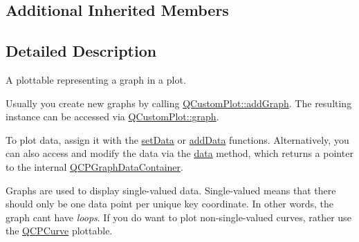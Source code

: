 \subsection*{Additional Inherited Members}


\subsection{Detailed Description}
A plottable representing a graph in a plot. 



Usually you create new graphs by calling \hyperlink{class_q_custom_plot_a6fb2873d35a8a8089842d81a70a54167}{Q\+Custom\+Plot\+::add\+Graph}. The resulting instance can be accessed via \hyperlink{class_q_custom_plot_a6ecae130f684b25276fb47bd3a5875c6}{Q\+Custom\+Plot\+::graph}.

To plot data, assign it with the \hyperlink{class_q_c_p_graph_a1eae9429a316b008e2d99b2d65a54395}{set\+Data} or \hyperlink{class_q_c_p_graph_ae0555c0d3fe0fa7cb8628f88158d420f}{add\+Data} functions. Alternatively, you can also access and modify the data via the \hyperlink{class_q_c_p_graph_a141aa31a1f19bbd0ce60f55eaeb9ea60}{data} method, which returns a pointer to the internal \hyperlink{qcustomplot_8h_a2e5583d1ae212f0deb10537cf975a15a}{Q\+C\+P\+Graph\+Data\+Container}.

Graphs are used to display single-\/valued data. Single-\/valued means that there should only be one data point per unique key coordinate. In other words, the graph can\textquotesingle{}t have {\itshape loops}. If you do want to plot non-\/single-\/valued curves, rather use the \hyperlink{class_q_c_p_curve}{Q\+C\+P\+Curve} plottable.


